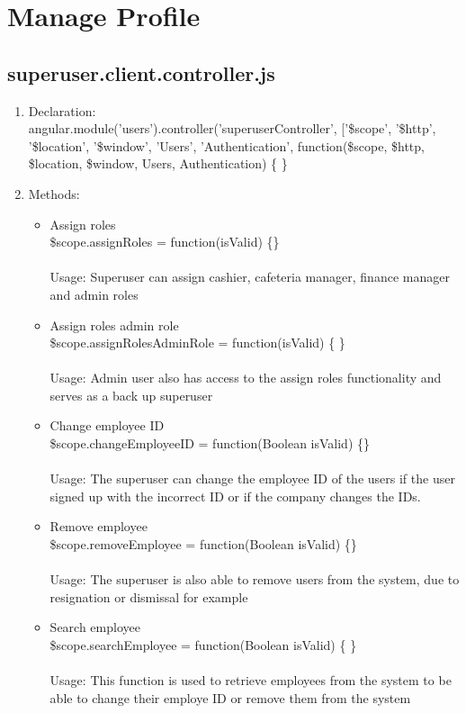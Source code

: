 \documentclass[a4paper,12pt]{article}
\begin{document}
\section{Manage Profile}
\subsection{superuser.client.controller.js}
\begin{enumerate}
\item Declaration: \\ angular.module('users').controller('superuserController', ['\$scope', '\$http', '\$location', '\$window', 'Users', 'Authentication',
	function(\$scope, \$http, \$location, \$window, Users, Authentication) \{ \}
\item Methods: 
	\begin{itemize}
		\item Assign roles \\ \$scope.assignRoles = function(isValid) \{\} \\ \\
		Usage: Superuser can assign cashier, cafeteria manager, finance manager and admin roles
		\item Assign roles admin role \\ \$scope.assignRolesAdminRole = function(isValid) \{ \} \\ \\
		Usage: Admin user also has access to the assign roles functionality and serves as a back up superuser
		\item Change employee ID \\ \$scope.changeEmployeeID = function(Boolean isValid) \{\} \\ \\
		Usage: The superuser can change the employee ID of the users if the user signed up with the incorrect ID or if the company changes the IDs.
		\item Remove employee \\ \$scope.removeEmployee = function(Boolean isValid) \{\}
		\\ \\ Usage: The superuser is also able to remove users from the system, due to resignation or dismissal for example
		\item Search employee \\ \$scope.searchEmployee = function(Boolean isValid) \{ \}
		\\ \\ Usage: This function is used to retrieve employees from the system to be able to change their employe ID or remove them from the system

\end{itemize}
\end{enumerate}
\end{document}
